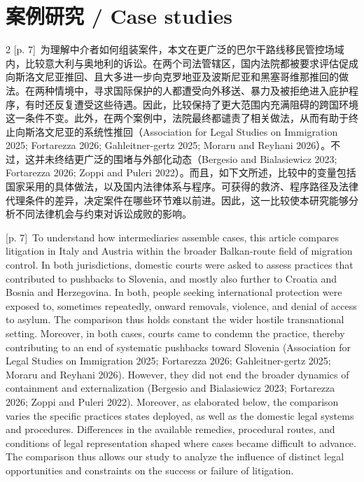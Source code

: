 \documentclass[10pt,a4paper]{article}
\begin{document}
\section*{案例研究 / Case studies}
\begin{paracol}{2}
{\scriptsize\color{gray} [p. 7]}\ 为理解中介者如何组装案件，本文在更广泛的巴尔干路线移民管控场域内，比较意大利与奥地利的诉讼。在两个司法管辖区，国内法院都被要求评估促成向斯洛文尼亚推回、且大多进一步向克罗地亚及波斯尼亚和黑塞哥维那推回的做法。在两种情境中，寻求国际保护的人都遭受向外移送、暴力及被拒绝进入庇护程序，有时还反复遭受这些待遇。因此，比较保持了更大范围内充满阻碍的跨国环境这一条件不变。此外，在两个案例中，法院最终都谴责了相关做法，从而有助于终止向斯洛文尼亚的系统性推回（Association for Legal Studies on Immigration 2025; Fortarezza 2026; Gahleitner-gertz 2025; Moraru and Reyhani 2026）。不过，这并未终结更广泛的围堵与外部化动态（Bergesio and Bialasiewicz 2023; Fortarezza 2026; Zoppi and Puleri 2022）。而且，如下文所述，比较中的变量包括国家采用的具体做法，以及国内法律体系与程序。可获得的救济、程序路径及法律代理条件的差异，决定案件在哪些环节难以前进。因此，这一比较使本研究能够分析不同法律机会与约束对诉讼成败的影响。\par
\switchcolumn
{\scriptsize\color{gray} [p. 7]}\ To understand how intermediaries assemble cases, this article compares litigation in Italy and Austria within the broader Balkan-route field of migration control. In both jurisdictions, domestic courts were asked to assess practices that contributed to pushbacks to Slovenia, and mostly also further to Croatia and Bosnia and Herzegovina. In both, people seeking international protection were exposed to, sometimes repeatedly, onward removals, violence, and denial of access to asylum. The comparison thus holds constant the wider hostile transnational setting. Moreover, in both cases, courts came to condemn the practice, thereby contributing to an end of systematic pushbacks toward Slovenia (Association for Legal Studies on Immigration 2025; Fortarezza 2026; Gahleitner-gertz 2025; Moraru and Reyhani 2026). However, they did not end the broader dynamics of containment and externalization (Bergesio and Bialasiewicz 2023; Fortarezza 2026; Zoppi and Puleri 2022). Moreover, as elaborated below, the comparison varies the specific practices states deployed, as well as the domestic legal systems and procedures. Differences in the available remedies, procedural routes, and conditions of legal representation shaped where cases became difficult to advance. The comparison thus allows our study to analyze the influence of distinct legal opportunities and constraints on the success or failure of litigation.\par

\end{paracol}
\end{document}
